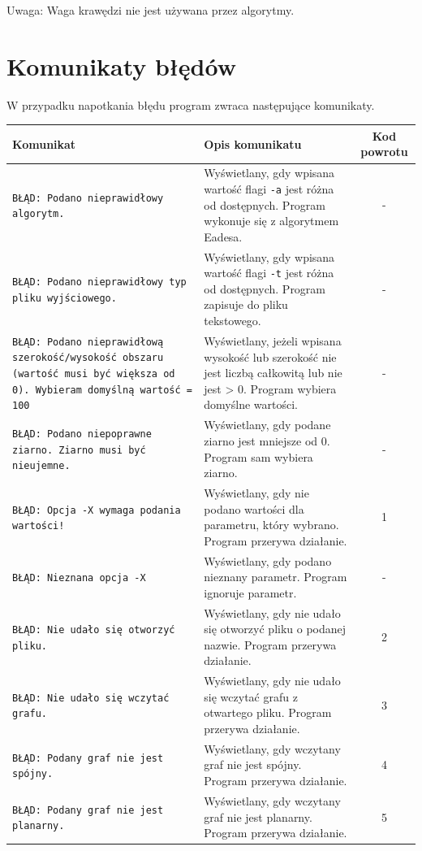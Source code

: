 \documentclass[]{article}
\begin{document}
	Uwaga: Waga krawędzi nie jest używana przez algorytmy.
	
	\section{Komunikaty błędów}
	W przypadku napotkania błędu program zwraca następujące komunikaty.

	\begin{tabularx}{\textwidth}{| X | X | c |}
		\hline
		Komunikat & Opis komunikatu & Kod powrotu\\
		\hline
		\texttt{BŁĄD: Podano nieprawidłowy algorytm.} & Wyświetlany, gdy wpisana wartość flagi 
		\texttt{-a} jest różna od dostępnych. Program wykonuje się z algorytmem Eadesa. & -\\
		\hline
		\texttt{BŁĄD: Podano nieprawidłowy typ pliku wyjściowego.} & Wyświetlany, gdy wpisana wartość 
		flagi \texttt{-t} jest różna od dostępnych. Program zapisuje do pliku tekstowego. & -\\
		\hline
		\texttt{BŁĄD: Podano nieprawidłową szerokość/wysokość obszaru (wartość musi być większa od 0). Wybieram domyślną wartość = 100} & Wyświetlany, jeżeli wpisana wysokość lub szerokość nie 
		jest liczbą całkowitą lub nie jest > 0. Program wybiera domyślne wartości. & -\\
		\hline
		\texttt{BŁĄD: Podano niepoprawne ziarno. Ziarno musi być nieujemne.} & Wyświetlany, gdy podane ziarno jest mniejsze od 
		0. Program sam wybiera ziarno. & -\\
		\hline
		\texttt{BŁĄD: Opcja -X wymaga podania wartości!} & Wyświetlany, gdy nie podano wartości dla parametru, który wybrano. 
		Program przerywa działanie. & 1\\
		\hline
		\texttt{BŁĄD: Nieznana opcja -X} & Wyświetlany, gdy podano nieznany parametr. Program ignoruje parametr. & -\\
		\hline
		\texttt{BŁĄD: Nie udało się otworzyć pliku.} & Wyświetlany, gdy nie udało się otworzyć pliku o podanej nazwie.
		Program przerywa działanie. & 2\\
		\hline
		\texttt{BŁĄD: Nie udało się wczytać grafu.} & Wyświetlany, gdy nie udało się wczytać grafu z otwartego pliku.
		Program przerywa działanie. & 3\\
		\hline
		\texttt{BŁĄD: Podany graf nie jest spójny.} & Wyświetlany, gdy wczytany graf nie jest spójny. Program przerywa 
		działanie.& 4\\
		\hline
		\texttt{BŁĄD: Podany graf nie jest planarny.} & Wyświetlany, gdy wczytany graf nie jest planarny. Program przerywa działanie. & 5\\

\end{tabularx}
\end{document}
